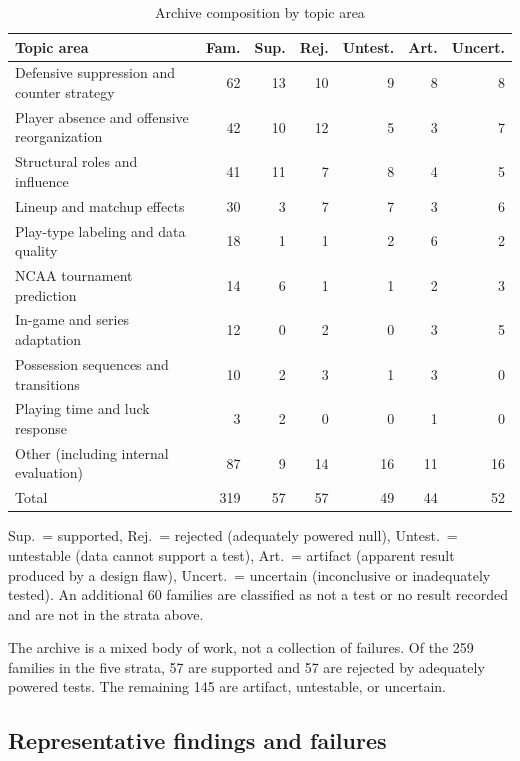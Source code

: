 \documentclass[11pt]{article}
\begin{document}
\begin{table}[ht]
\centering
\caption{Archive composition by topic area}
\label{tab:archive_topics}
\small
\begin{tabular}{lrrrrrr}
\toprule
Topic area & Fam. & Sup. & Rej. & Untest. & Art. & Uncert. \\
\midrule
Defensive suppression and counter strategy & 62 & 13 & 10 & 9 & 8 & 8 \\
Player absence and offensive reorganization & 42 & 10 & 12 & 5 & 3 & 7 \\
Structural roles and influence & 41 & 11 & 7 & 8 & 4 & 5 \\
Lineup and matchup effects & 30 & 3 & 7 & 7 & 3 & 6 \\
Play-type labeling and data quality & 18 & 1 & 1 & 2 & 6 & 2 \\
NCAA tournament prediction & 14 & 6 & 1 & 1 & 2 & 3 \\
In-game and series adaptation & 12 & 0 & 2 & 0 & 3 & 5 \\
Possession sequences and transitions & 10 & 2 & 3 & 1 & 3 & 0 \\
Playing time and luck response & 3 & 2 & 0 & 0 & 1 & 0 \\
Other (including internal evaluation) & 87 & 9 & 14 & 16 & 11 & 16 \\
\midrule
Total & 319 & 57 & 57 & 49 & 44 & 52 \\
\bottomrule
\end{tabular}

\vspace{0.4em}
\begin{minipage}{0.92\linewidth}\footnotesize
Sup.\ = supported, Rej.\ = rejected (adequately powered null), Untest.\ = untestable (data cannot support a test), Art.\ = artifact (apparent result produced by a design flaw), Uncert.\ = uncertain (inconclusive or inadequately tested). An additional 60 families are classified as not a test or no result recorded and are not in the strata above.
\end{minipage}
\end{table}

The archive is a mixed body of work, not a collection of failures. Of the 259 families in the five strata, 57 are supported and 57 are rejected by adequately powered tests. The remaining 145 are artifact, untestable, or uncertain.

\subsection{Representative findings and failures}
\end{document}
